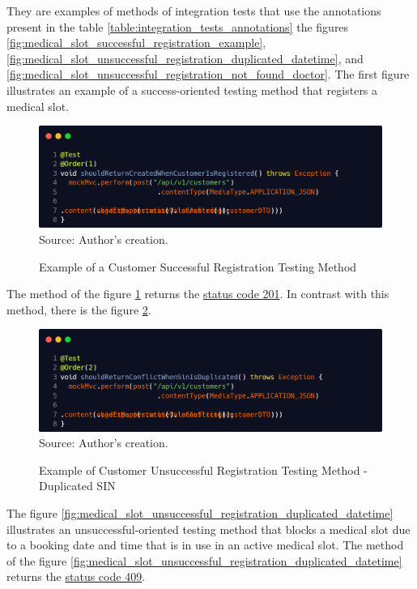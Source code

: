They are examples of methods of integration tests that use the annotations present in the table \ref{table:integration_tests_annotations} the figures \ref{fig:medical_slot_successful_registration_example},
\ref{fig:medical_slot_unsuccessful_registration_duplicated_datetime},
and \ref{fig:medical_slot_unsuccessful_registration_not_found_doctor}. The first figure illustrates an example of a success-oriented testing method that registers a medical slot.

\begin{figure}[H]
    \centering
    \caption{Example of a Customer Successful Registration Testing Method}
    \includegraphics[width=1\linewidth]{figures/tests/customer_successful_registration_example.png}
    \footnotesize Source: Author's creation.
    \label{fig:customer_successful_registration_example}
\end{figure}

The method of the figure \ref{fig:customer_successful_registration_example} returns the \hyperref[tab:summary_http_status_codes]{status code 201}. In contrast with this method, there is the figure \ref{fig:customer_unsuccessful_registration_duplicated_sin}.

\begin{figure}[H]
    \centering
    \caption{Example of Customer Unsuccessful Registration Testing Method - Duplicated SIN}
    \includegraphics[width=1\linewidth]{figures/tests/customer_unsuccessful_registration_duplicated_sin.PNG}
    \footnotesize Source: Author's creation.
    \label{fig:customer_unsuccessful_registration_duplicated_sin}
\end{figure}

The figure \ref{fig:medical_slot_unsuccessful_registration_duplicated_datetime} illustrates an unsuccessful-oriented testing method that blocks a medical slot due to a booking date and time that is in use in an active medical slot. The method of the figure \ref{fig:medical_slot_unsuccessful_registration_duplicated_datetime} returns the \hyperref[tab:summary_http_status_codes]{status code 409}.


